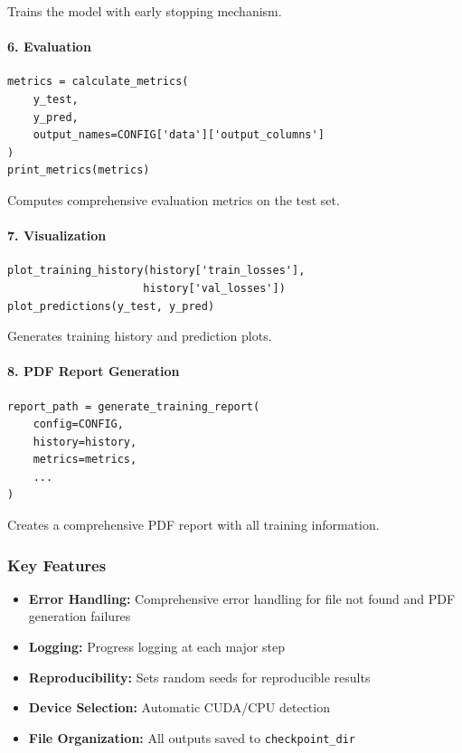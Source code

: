 \documentclass[11pt,a4paper]{article}
\begin{document}
Trains the model with early stopping mechanism.

\paragraph{6. Evaluation}
\begin{lstlisting}
metrics = calculate_metrics(
    y_test,
    y_pred,
    output_names=CONFIG['data']['output_columns']
)
print_metrics(metrics)
\end{lstlisting}

Computes comprehensive evaluation metrics on the test set.

\paragraph{7. Visualization}
\begin{lstlisting}
plot_training_history(history['train_losses'],
                     history['val_losses'])
plot_predictions(y_test, y_pred)
\end{lstlisting}

Generates training history and prediction plots.

\paragraph{8. PDF Report Generation}
\begin{lstlisting}
report_path = generate_training_report(
    config=CONFIG,
    history=history,
    metrics=metrics,
    ...
)
\end{lstlisting}

Creates a comprehensive PDF report with all training information.

\subsubsection{Key Features}

\begin{itemize}
    \item \textbf{Error Handling:} Comprehensive error handling for file not found and PDF generation failures
    \item \textbf{Logging:} Progress logging at each major step
    \item \textbf{Reproducibility:} Sets random seeds for reproducible results
    \item \textbf{Device Selection:} Automatic CUDA/CPU detection
    \item \textbf{File Organization:} All outputs saved to \texttt{checkpoint\_dir}
\end{itemize}
\end{document}
